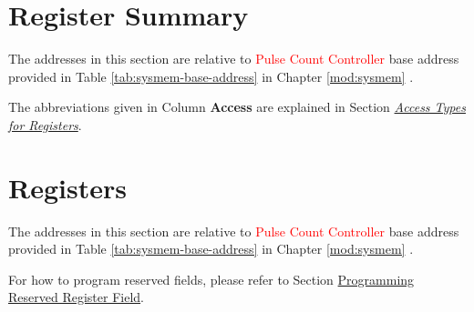 \documentclass[main\_\_EN.tex]{subfiles}
\begin{document}



\newpage
\hypertarget{pcnt-reg-summ}{}
\section{Register Summary}
\label{sec:pcnt-reg-summ}


The addresses in this section are relative to \textcolor{red}{Pulse Count Controller} base address provided in Table \ref{tab:sysmem-base-address} in Chapter \ref{mod:sysmem} \textit{}.

The abbreviations given in Column \textbf{Access} are explained in Section \hyperref[glossary-access-types]{\textit{Access Types for Registers}}.






\newpage
\section{Registers}

The addresses in this section are relative to \textcolor{red}{Pulse Count Controller} base address provided in Table \ref{tab:sysmem-base-address} in Chapter \ref{mod:sysmem} \textit{}.

For how to program reserved fields, please refer to Section \hyperref[programming-reserved-field]{Programming Reserved Register Field}.


\end{document}

